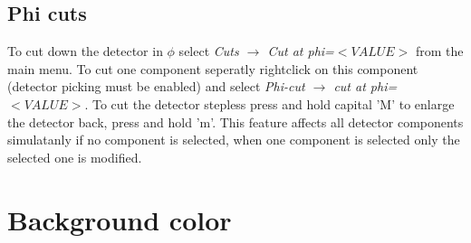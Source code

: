 \documentclass[a4paper,10pt]{article}
\begin{document}
\subsection{Phi cuts}
To cut down the detector in $\phi$ select \textit{Cuts $\to$ Cut at phi=$<VALUE>$} from the main menu.
To cut one component seperatly rightclick on this component (detector picking must be enabled) and select \textit{Phi-cut $\to$ cut at phi=$<VALUE>$}. 
To cut the detector stepless press and hold capital 'M' to enlarge the detector back, press and hold 'm'.
This feature affects all detector components simulatanly if no component is selected, when one component is selected only the selected one is modified.




\section{Background color}
\end{document}
